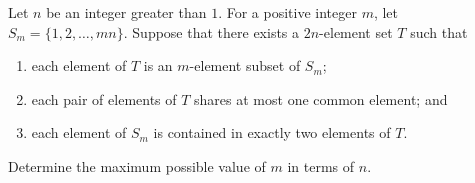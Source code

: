 Let $n$ be an integer greater than $1$. For a positive integer $m$, let $S_{m}= \{ 1,2,\ldots, mn\}$. Suppose that there exists a $2n$-element set $T$ such that
\begin{enumerate}[label=(\alph*)]
	\item each element of $T$ is an $m$-element subset of $S_{m}$;
	\item each pair of elements of $T$ shares at most one common element; and
	\item each element of $S_{m}$ is contained in exactly two elements of $T$.
\end{enumerate}
Determine the maximum possible value of $m$ in terms of $n$.